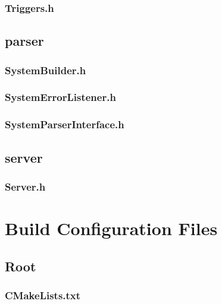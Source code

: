 \subsection{Triggers.h}


\section{parser}

\subsection{SystemBuilder.h}


\subsection{SystemErrorListener.h}


\subsection{SystemParserInterface.h}


\section{server}

\subsection{Server.h}


\chapter{Build Configuration Files}

\section{Root}

\subsection{CMakeLists.txt}


